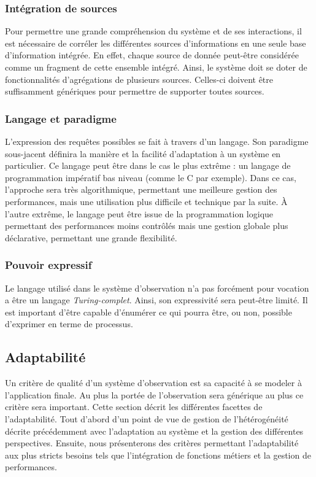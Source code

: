 \subsubsection{Intégration de sources}
Pour permettre une grande compréhension du système et de ses interactions, il est nécessaire de corréler les différentes sources d'informations en une seule base d'information intégrée. En effet, chaque source de donnée peut-être considérée comme un fragment de cette ensemble intégré. Ainsi, le système doit se doter de fonctionnalités d'agrégations de plusieurs sources. Celles-ci doivent être suffisamment génériques pour permettre de supporter toutes sources.

\subsubsection{Langage et paradigme}
L'expression des requêtes possibles se fait à travers d'un langage. Son paradigme sous-jacent définira la manière et la facilité d'adaptation à un système en particulier. Ce langage peut être dans le cas le plus extrême : un langage de programmation impératif bas niveau (comme le C par exemple). Dans ce cas, l'approche sera très algorithmique, permettant une meilleure gestion des performances, mais une utilisation plus difficile et technique par la suite. À l'autre extrême, le langage peut être issue de la programmation logique permettant des performances moins contrôlés mais une gestion globale plus déclarative, permettant une grande flexibilité.

\subsubsection{Pouvoir expressif}
Le langage utilisé dans le système d'observation n'a pas forcément pour vocation a être un langage \textit{Turing-complet}. Ainsi, son expressivité sera peut-être limité. Il est important d'être capable d'énumérer ce qui pourra être, ou non, possible d'exprimer en terme de processus.

\subsection{Adaptabilité}
Un critère de qualité d'un système d'observation est sa capacité à se modeler à l'application finale. Au plus la portée de l'observation sera générique au plus ce critère sera important. Cette section décrit les différentes facettes de l'adaptabilité. Tout d'abord d'un point de vue de gestion de l'hétérogénéité décrite précédemment avec l'adaptation au système et la gestion des différentes perspectives. Ensuite, nous présenterons des critères permettant l'adaptabilité aux plus stricts besoins tels que l'intégration de fonctions métiers et la gestion de performances.

